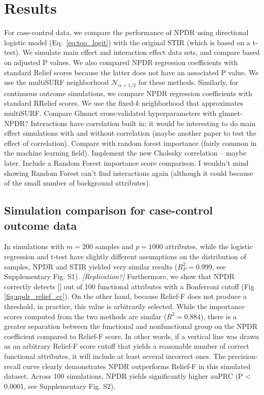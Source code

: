 \documentclass[10pt]{article}
\begin{document}

\section{Results}
For case-control data, we compare the performance of NPDR using directional logistic model (Eq.~\ref{eq:too_logit}) with the original STIR (which is based on a t-test).
We simulate main effect and interaction effect data sets, and compare based on adjusted P values.
We also compared NPDR regression coefficients with standard Relief scores because the latter does not have an associated P value. We use the multiSURF neighborhood $\mathcal{N}_{\alpha=1/2}$ for these methods.
Similarly, for continuous outcome simulations, we compare NPDR regression coefficients with standard RRelief scores. We use the fixed-$k$ neighborhood that approximates multiSURF. Compare Glmnet cross-validated hyperparameters with glmnet-NPDR? Interactions have correlation built in; it would be interesting to do main effect simulations with and without correlation (maybe another paper to test the effect of correlation). Compare with random forest importance (fairly common in the machine learning field). Implement the new Cholesky correlation -- maybe later. Include a Random Forest importance score comparison. I wouldn't mind showing Random Forest can't find interactions again (although it could because of the small number of background attributes). 

\subsection{Simulation comparison for case-control outcome data} 
In simulations with $m = 200$ samples and $p = 1000$ attributes, while the logistic regression and t-test have slightly different assumptions on the distribution of samples, NPDR and STIR yielded very similar results ($R_P^2 = 0.999$, see Supplementary Fig. S1). \emph{[Replication?]}
Furthermore, we show that NPDR correctly detects [] out of 100 functional attributes with a Bonferroni cutoff (Fig \ref{fig:npdr_relief_cc}).
On the other hand, because Relief-F does not produce a threshold, in practice, this value is arbitrarily selected.
While the importance scores computed from the two methods are similar ($R^2 = 0.884$), there is a greater separation between the functional and nonfunctional group on the NPDR coefficient compared to Relief-F score.
In other words, if a vertical line was drawn as an arbitrary Relief-F score cutoff that yields a reasonable number of correct functional attributes, it will include at least several incorrect ones. 
The precision-recall curve clearly demonstrates NPDR outperforms Relief-F in this simulated dataset.
Across 100 simulations, NPDR yields significantly higher auPRC (P < 0.0001, see Supplementary Fig. S2).
\end{document}
